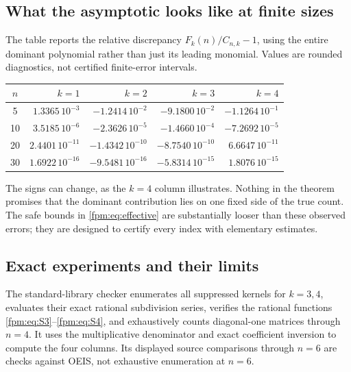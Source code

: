 \documentclass[11pt]{article}
\theoremstyle{definition}\newtheorem{definition}[theorem]{Definition}
\theoremstyle{remark}\newtheorem{remark}[theorem]{Remark}
\begin{document}
\subsection{What the asymptotic looks like at finite sizes}
The table reports the relative discrepancy $F_k(n)/C_{n,k}-1$, using the entire dominant polynomial rather than just its leading monomial. Values are rounded diagnostics, not certified finite-error intervals.
\begin{center}\small
\begin{tabular}{c r r r r}
\toprule
$n$ & $k=1$ & $k=2$ & $k=3$ & $k=4$\\
\midrule
5  &$1.3365\,10^{-3}$ &$-1.2414\,10^{-2}$ &$-9.1800\,10^{-2}$ &$-1.1264\,10^{-1}$\\
10 &$3.5185\,10^{-6}$ &$-2.3626\,10^{-5}$ &$-1.4660\,10^{-4}$ &$-7.2692\,10^{-5}$\\
20 &$2.4401\,10^{-11}$ &$-1.4342\,10^{-10}$ &$-8.7540\,10^{-10}$ &$6.6647\,10^{-11}$\\
30 &$1.6922\,10^{-16}$ &$-9.5481\,10^{-16}$ &$-5.8314\,10^{-15}$ &$1.8076\,10^{-15}$\\
\bottomrule
\end{tabular}
\end{center}
The signs can change, as the $k=4$ column illustrates. Nothing in the theorem promises that the dominant contribution lies on one fixed side of the true count. The safe bounds in \eqref{fpm:eq:effective} are substantially looser than these observed errors; they are designed to certify every index with elementary estimates.

\subsection{Exact experiments and their limits}
The standard-library checker enumerates all suppressed kernels for $k=3,4$, evaluates their exact rational subdivision series, verifies the rational functions \eqref{fpm:eq:S3}--\eqref{fpm:eq:S4}, and exhaustively counts diagonal-one matrices through $n=4$. It uses the multiplicative denominator and exact coefficient inversion to compute the four columns. Its displayed source comparisons through $n=6$ are checks against OEIS, not exhaustive enumeration at $n=6$.
\end{document}
